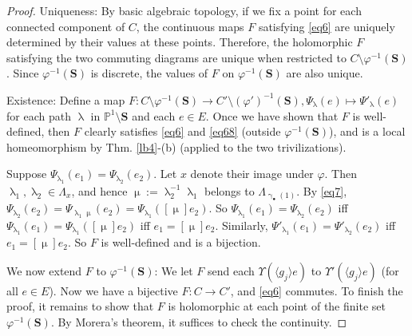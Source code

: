 \documentclass[12pt,a4paper,notitlepage]{article}
\theoremstyle{definition}
\theoremstyle{plain}
\newcommand{\bk}[1]{\langle {#1}\rangle}
\newcommand{\blt}{\bullet}
\newcommand{\Pbb}{\mathbb P}
\newcommand{\Sbf}{\mathbf{S}}
\numberwithin{equation}{subsection}
\begin{document}
\begin{proof}
Uniqueness: By basic algebraic topology, if we fix a point for each connected component of $C$, the  continuous maps $F$ satisfying \eqref{eq6} are uniquely determined by their values at these points. Therefore, the holomorphic $F$ satisfying the two commuting diagrams are unique when  restricted to $C\setminus\varphi^{-1}(\Sbf)$. Since $\varphi^{-1}(\Sbf)$ is discrete, the values of $F$ on 	$\varphi^{-1}(\Sbf)$ are also unique.
	
Existence: Define a map $F:C\setminus\varphi^{-1}(\Sbf)\rightarrow C'\setminus(\varphi')^{-1}(\Sbf),\Psi_\uplambda(e)\mapsto \Psi'_\uplambda(e)$ for each path $\uplambda$ in $\Pbb^1\setminus\Sbf$ and each $e\in E$. Once we have shown that $F$ is well-defined, then $F$ clearly satisfies \eqref{eq6} and \eqref{eq68} (outside $\varphi^{-1}(\Sbf)$), and is a local homeomorphism by Thm. \ref{lb4}-(b) (applied to the two trivilizations).

Suppose $\Psi_{\uplambda_1}(e_1)=\Psi_{\uplambda_2}(e_2)$. Let $x$ denote their image under $\varphi$. Then $\uplambda_1,\uplambda_2\in\Lambda_x$, and hence $\upmu:=\uplambda_2^{-1}\uplambda_1$ belongs to $\Lambda_{\upgamma_\blt(1)}$. By \eqref{eq7}, $\Psi_{\uplambda_2}(e_2)=\Psi_{\uplambda_1\upmu}(e_2)=\Psi_{\uplambda_1}([\upmu]e_2)$. So $\Psi_{\uplambda_1}(e_1)=\Psi_{\uplambda_2}(e_2)$ iff $\Psi_{\uplambda_1}(e_1)=\Psi_{\uplambda_1}([\upmu]e_2)$ iff $e_1=[\upmu]e_2$. Similarly, $\Psi'_{\uplambda_1}(e_1)=\Psi'_{\uplambda_2}(e_2)$ iff $e_1=[\upmu]e_2$. So $F$ is well-defined and is a bijection.


We now extend $F$ to $\varphi^{-1}(\Sbf)$: We let $F$ send each $\Upsilon(\bk{g_j}e)$ to $\Upsilon'(\bk{g_j}e)$ (for all $e\in E$). Now we have a bijective $F:C\rightarrow C'$, and \eqref{eq6} commutes. To finish the proof, it remains to show that $F$ is holomorphic at each point of the finite set $\varphi^{-1}(\Sbf)$. By Morera's theorem, it suffices to check the continuity.


\end{proof}
\end{document}
